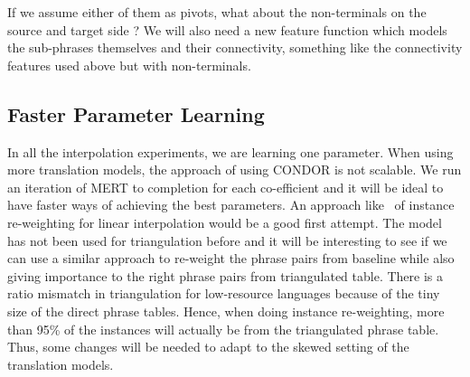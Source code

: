 	If we assume either of them as pivots, what about the non-terminals on the source and target side ? We will also need a new feature function which models the sub-phrases themselves and their connectivity, something like the connectivity features used above but with non-terminals. 

\subsection{Faster Parameter Learning}
	In all the interpolation experiments, we are learning one parameter. When using more translation models, the approach of using CONDOR is not scalable. We run an iteration of MERT to completion for each co-efficient and it will be ideal to have faster ways of achieving the best parameters. An approach like~\cite{Foster:07} of instance re-weighting for linear interpolation would be a good first attempt. The model has not been used for triangulation before and it will be interesting to see if we can use a similar approach to re-weight the phrase pairs from baseline while also giving importance to the right phrase pairs from triangulated table. There is a ratio mismatch in triangulation for low-resource languages because of the tiny size of the direct phrase tables. Hence, when doing instance re-weighting, more than 95\% of the instances will actually be from the triangulated phrase table. Thus, some changes will be needed to adapt to the skewed setting of the translation models. 














